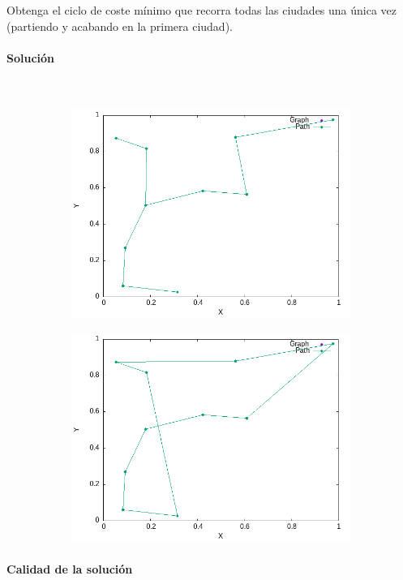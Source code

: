 \documentclass{article}
\newcommand{\myparagraph}[1]{\paragraph{#1}\mbox{}\\}
\begin{document}
Obtenga el ciclo de coste mínimo que recorra todas las ciudades una única vez (partiendo y acabando en la primera ciudad).
\myparagraph{Solución}
\begin{figure}[!hbt]
    \centering
    \begin{subfigure}{0.45\textwidth}
        \includegraphics[width=\textwidth]{Problema4/imagenes/example_graph_mst.png}
    \end{subfigure}
    \begin{subfigure}{0.45\textwidth}
        \includegraphics[width=\textwidth]{Problema4/imagenes/example_graph_sol_v2.png}
    \end{subfigure}
\end{figure}
\myparagraph{Calidad de la solución}
\end{document}
